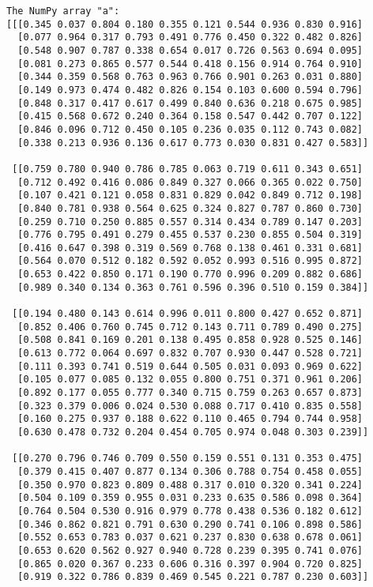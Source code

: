 \documentclass[11pt]{article}
\begin{document}
    \begin{Verbatim}[commandchars=\\\{\}]
The NumPy array "a":
[[[0.345 0.037 0.804 0.180 0.355 0.121 0.544 0.936 0.830 0.916]
  [0.077 0.964 0.317 0.793 0.491 0.776 0.450 0.322 0.482 0.826]
  [0.548 0.907 0.787 0.338 0.654 0.017 0.726 0.563 0.694 0.095]
  [0.081 0.273 0.865 0.577 0.544 0.418 0.156 0.914 0.764 0.910]
  [0.344 0.359 0.568 0.763 0.963 0.766 0.901 0.263 0.031 0.880]
  [0.149 0.973 0.474 0.482 0.826 0.154 0.103 0.600 0.594 0.796]
  [0.848 0.317 0.417 0.617 0.499 0.840 0.636 0.218 0.675 0.985]
  [0.415 0.568 0.672 0.240 0.364 0.158 0.547 0.442 0.707 0.122]
  [0.846 0.096 0.712 0.450 0.105 0.236 0.035 0.112 0.743 0.082]
  [0.338 0.213 0.936 0.136 0.617 0.773 0.030 0.831 0.427 0.583]]

 [[0.759 0.780 0.940 0.786 0.785 0.063 0.719 0.611 0.343 0.651]
  [0.712 0.492 0.416 0.086 0.849 0.327 0.066 0.365 0.022 0.750]
  [0.107 0.421 0.121 0.058 0.831 0.829 0.042 0.849 0.712 0.198]
  [0.840 0.781 0.938 0.564 0.625 0.324 0.827 0.787 0.860 0.730]
  [0.259 0.710 0.250 0.885 0.557 0.314 0.434 0.789 0.147 0.203]
  [0.776 0.795 0.491 0.279 0.455 0.537 0.230 0.855 0.504 0.319]
  [0.416 0.647 0.398 0.319 0.569 0.768 0.138 0.461 0.331 0.681]
  [0.564 0.070 0.512 0.182 0.592 0.052 0.993 0.516 0.995 0.872]
  [0.653 0.422 0.850 0.171 0.190 0.770 0.996 0.209 0.882 0.686]
  [0.989 0.340 0.134 0.363 0.761 0.596 0.396 0.510 0.159 0.384]]

 [[0.194 0.480 0.143 0.614 0.996 0.011 0.800 0.427 0.652 0.871]
  [0.852 0.406 0.760 0.745 0.712 0.143 0.711 0.789 0.490 0.275]
  [0.508 0.841 0.169 0.201 0.138 0.495 0.858 0.928 0.525 0.146]
  [0.613 0.772 0.064 0.697 0.832 0.707 0.930 0.447 0.528 0.721]
  [0.111 0.393 0.741 0.519 0.644 0.505 0.031 0.093 0.969 0.622]
  [0.105 0.077 0.085 0.132 0.055 0.800 0.751 0.371 0.961 0.206]
  [0.892 0.177 0.055 0.777 0.340 0.715 0.759 0.263 0.657 0.873]
  [0.323 0.379 0.006 0.024 0.530 0.088 0.717 0.410 0.835 0.558]
  [0.160 0.275 0.937 0.188 0.622 0.110 0.465 0.794 0.744 0.958]
  [0.630 0.478 0.732 0.204 0.454 0.705 0.974 0.048 0.303 0.239]]

 [[0.270 0.796 0.746 0.709 0.550 0.159 0.551 0.131 0.353 0.475]
  [0.379 0.415 0.407 0.877 0.134 0.306 0.788 0.754 0.458 0.055]
  [0.350 0.970 0.823 0.809 0.488 0.317 0.010 0.320 0.341 0.224]
  [0.504 0.109 0.359 0.955 0.031 0.233 0.635 0.586 0.098 0.364]
  [0.764 0.504 0.530 0.916 0.979 0.778 0.438 0.536 0.182 0.612]
  [0.346 0.862 0.821 0.791 0.630 0.290 0.741 0.106 0.898 0.586]
  [0.552 0.653 0.783 0.037 0.621 0.237 0.830 0.638 0.678 0.061]
  [0.653 0.620 0.562 0.927 0.940 0.728 0.239 0.395 0.741 0.076]
  [0.865 0.020 0.367 0.233 0.606 0.316 0.397 0.904 0.720 0.825]
  [0.919 0.322 0.786 0.839 0.469 0.545 0.221 0.787 0.230 0.603]]


\end{Verbatim}
\end{document}
